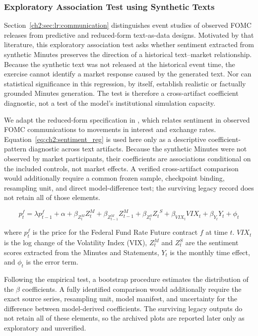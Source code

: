 \subsubsection*{Exploratory Association Test using Synthetic Texts}


Section~\ref{ch2:sec:lr:communication} distinguishes event studies of observed
FOMC releases from predictive and reduced-form text-as-data designs. Motivated
by that literature, this exploratory association test asks whether sentiment
extracted from synthetic Minutes preserves the direction of a historical
text--market relationship. Because the synthetic text was not released at the
historical event time, the exercise cannot identify a market response caused
by the generated text. Nor can statistical significance in this regression,
by itself, establish realistic or factually grounded Minutes generation. The
test is therefore a cross-artifact coefficient diagnostic, not a test of the
model's institutional simulation capacity.



We adapt the reduced-form specification in \citet{tadle2022fomc}, which relates
sentiment in observed FOMC communications to movements in interest and
exchange rates. Equation~\ref{eq:ch2:sentiment_reg} is used here only as a
descriptive coefficient-pattern diagnostic across text artifacts. Because the
synthetic Minutes were not observed by market participants, their coefficients
are associations conditional on the included controls, not market effects. A
verified cross-artifact comparison would additionally require a common frozen
sample, checkpoint binding, resampling unit, and direct model-difference test;
the surviving legacy record does not retain all of those elements.



\begin{equation}\label{eq:ch2:sentiment_reg}
    p^f_t = \lambda p^f_{t-1} + \alpha + \beta_{Z_t^M} Z_t^M+ \beta_{Z_{t-1}^M} Z_{t-1}^M + \beta_{Z_t^S} {Z_t}^S + \beta_{VIX_t}VIX_t + \beta_{Y_t}Y_t + \phi_t 
\end{equation}



where $p^f_t$ is the price for the Federal Fund Rate Future contract $f$ at time $t$. $VIX_t$ is the log change of the Volatility Index (VIX), $Z_t^M$ and $Z_t^S$ are the sentiment scores extracted from the Minutes and Statements, $Y_t$ is the monthly time effect, and $\phi_t$ is the error term.

Following the empirical test, a bootstrap procedure estimates the distribution of the $\beta$ coefficients. A fully identified comparison would additionally require the exact source series, resampling unit, model manifest, and uncertainty for the difference between model-derived coefficients. The surviving legacy outputs do not retain all of these elements, so the archived plots are reported later only as exploratory and unverified.



